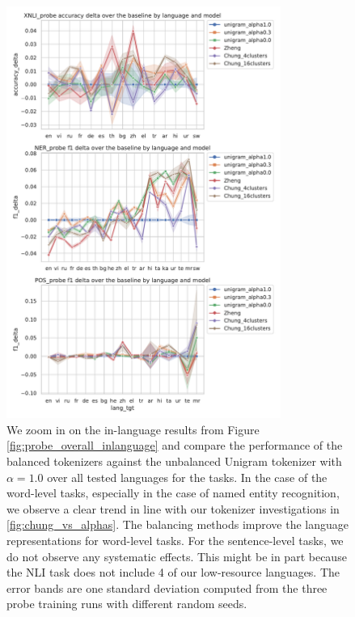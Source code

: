 \begin{figure}
    \centering
    \includegraphics[width=0.8\textwidth]{figures/probe_detailed_inlanguage_over_baseline.pdf}
    \caption{We zoom in on the in-language results from Figure \ref{fig:probe_overall_inlanguage} and compare the performance of the balanced tokenizers against the unbalanced Unigram tokenizer with $\alpha=1.0$ over all tested languages for the tasks. In the case of the word-level tasks, especially in the case of named entity recognition, we observe a clear trend in line with our tokenizer investigations in \ref{fig:chung_vs_alphas}. The balancing methods improve the language representations for word-level tasks. For the sentence-level tasks, we do not observe any systematic effects. This might be in part because the NLI task does not include 4 of our low-resource languages. The error bands are one standard deviation computed from the three probe training runs with different random seeds.}
    \label{fig:probe_overall_inlanguage_over_baseline}
\end{figure}

